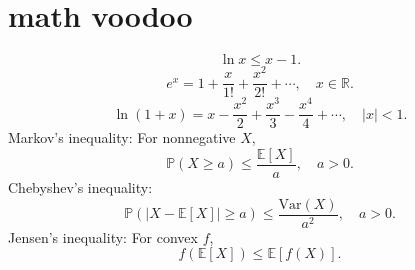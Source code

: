 \section{math voodoo}
\vspace{-4mm}
\[\ln{x}\le x-1.\] 
\[e^{x}=1+\frac{x}{1\mathpunct{!}}+\frac{x^{2}}{2\mathpunct{!}}+\cdots,\quad x\in \mathbb{R}.\] 
\[\ln{\left( 1+x \right) }=x-\frac{x^{2}}{2}+\frac{x^{3}}{3}-\frac{x^{4}}{4}+\cdots,\quad \left| x \right| <1.\] 
Markov's inequality: For nonnegative $X$,
\[\mathbb{P}\left( X\ge a \right) \le \frac{\mathbb{E}\left[ X \right]}{a},\quad a>0.\] 
Chebyshev's inequality:
\[\mathbb{P}\left( \left| X-\mathbb{E}\left[ X \right] \right| \ge a \right) \le \frac{\mathrm{Var}\left( X \right)}{a^{2}},\quad a>0.\]
Jensen's inequality: For convex $f$,
\[f\left( \mathbb{E}\left[ X \right] \right) \le \mathbb{E}\left[ f\left( X \right) \right].\]
